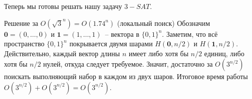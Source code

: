 Теперь мы готовы решать нашу задачу $3-SAT$.

\begin{algodescription}{Решение за $O\left(\sqrt{3}^n\right) = O(1.74^n)$ (локальный поиск)}
Обозначим $\mathbf 0 = (0, \ldots, 0)$ и $\mathbf 1 = (1, \ldots, 1)$~-- вектора в $\{0, 1\}^n$. Заметим, что всё пространство $\{0, 1\}^n$ покрывается двумя шарами $H(\mathbf 0, n/2)$ и $H(\mathbf 1, n/2)$. Действительно, каждый вектор длины $n$ имеет либо хотя бы $n/2$ единиц, либо хотя бы $n/2$ нулей, откуда следует требуемое. Значит, достаточно за $O(3^{n/2})$ поискать выполняющий набор в каждом из двух шаров. Итоговое время работы $O(3^{n/2}) + O(3^{n/2}) = O(3^{n/2})$.
\end{algodescription}

